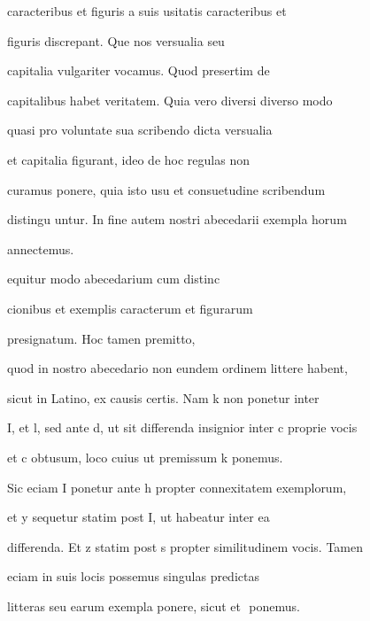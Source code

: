 caracteribus et figuris a suis usitatis caracteribus et 

figuris discrepant. Que nos versualia seu 

capitalia vulgariter vocamus. Quod presertim de 

capitalibus habet veritatem. Quia vero diversi diverso modo 

quasi pro voluntate sua scribendo dicta versualia 

et capitalia figurant, ideo de hoc regulas non 

curamus ponere, quia isto usu et consuetudine scribendum 

distingu untur. In fine autem nostri abecedarii exempla horum 

annectemus. 

\indentP {}equitur modo abecedarium cum distinc

cionibus et exemplis caracterum et figurarum 

presignatum. Hoc tamen premitto, 

quod in nostro abecedario non eundem ordinem littere habent, 

sicut in Latino, ex causis certis. Nam k non ponetur inter 

I, et l, sed ante d, ut sit differenda insignior inter c proprie vocis 

et c obtusum, loco cuius ut premissum k ponemus. 

Sic eciam I ponetur ante h propter connexitatem exemplorum, 

et y sequetur statim post I, ut habeatur inter ea 

 differenda. Et z statim post s propter similitudinem vocis. Tamen 

eciam in suis locis possemus singulas predictas 

\newpage






\fullpreviouslines


{
\color{blue}

litteras seu earum exempla ponere, sicut et 
ponemus. 


}




\endinput








